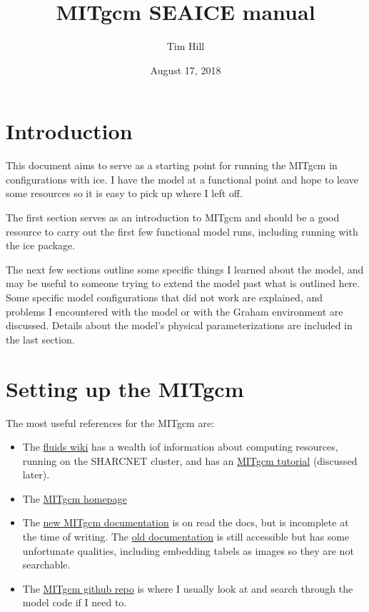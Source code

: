 \documentclass[11pt]{article}
\title{MITgcm SEAICE manual}
\author{Tim Hill}
\date{August 17, 2018}
\begin{document}
\maketitle

\tableofcontents{}

\pagebreak

\section{Introduction}

This document aims to serve as a starting point for running the MITgcm in configurations with ice. I have the model at a functional point and hope to leave some resources so it is easy to pick up where I left off.

The first section serves as an introduction to MITgcm and should be a good resource to carry out the first few functional model runs, including running with the ice package.

The next few sections outline some specific things I learned about the model, and may be useful to someone trying to extend the model past what is outlined here. Some specific model configurations that did not work are explained, and problems I encountered with the model or with the Graham environment are discussed. Details about the model's physical parameterizations are included in the last section.

\section{Setting up the MITgcm}
The most useful references for the MITgcm are:
\begin{itemize}
\item{The \href{https://wiki.math.uwaterloo.ca/fluidswiki/index.php?title=Main_Page}{fluids wiki} has a wealth iof information about computing resources, running on the SHARCNET cluster, and has an \href{https://wiki.math.uwaterloo.ca/fluidswiki/index.php?title=MITgcmTutorial}{MITgcm tutorial} (discussed later).}
\item{The \href{http://mitgcm.org}{MITgcm homepage}}
\item{The \href{https://mitgcm.readthedocs.io/en/latest/}{new MITgcm documentation} is on read the docs, but is incomplete at the time of writing. The \href{http://mitgcm.org/public/r2_manual/final/online_documents/node1.html}{old documentation} is still accessible but has some unfortunate qualities, including embedding tabels as images so they are not searchable.}
\item{The \href{https://github.com/MITgcm/MITgcm}{MITgcm github repo} is where I usually look at and search through the model code if I need to.}
\end{itemize}
\end{document}

